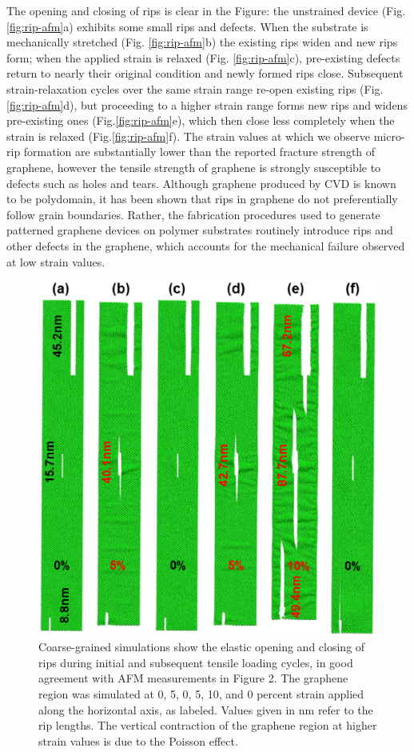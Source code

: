 \documentclass[edeposit,fullpage,draftthesis]{uiucthesis2009}
\begin{document}
        The opening and closing of rips is clear in the Figure:  the unstrained device
        (Fig. \ref{fig:rip-afm}a) exhibits some small rips and defects. When the substrate is
        mechanically stretched (Fig. \ref{fig:rip-afm}b) the existing rips widen and new rips form;
        when the applied strain is relaxed (Fig. \ref{fig:rip-afm}c), pre-existing defects return to
        nearly their original condition and newly formed rips close. Subsequent
        strain-relaxation cycles over the same strain range re-open existing rips (Fig.\ref{fig:rip-afm}d), 
        but proceeding to a higher strain range forms new rips and widens
        pre-existing ones (Fig.\ref{fig:rip-afm}e), which then close less completely when the strain
        is relaxed (Fig.\ref{fig:rip-afm}f). The strain values at which we observe micro-rip formation
        are substantially lower than the reported fracture strength of
        graphene\cite{Lee2008}, however the tensile strength of graphene is strongly
        susceptible to defects such as holes and tears\cite{lee2013high}. Although graphene
        produced by CVD is known to be polydomain, it has been shown that rips in
        graphene do not preferentially follow grain boundaries\cite{Kim2012}. Rather,
        the fabrication procedures used to generate patterned graphene devices on
        polymer substrates routinely introduce rips and other defects in the graphene,
        which accounts for the mechanical failure observed at low strain values.
 
        \begin{figure}
        \centering
        \includegraphics[width=0.5\linewidth]{images/resultsanddiscussion/rippingpaper/Figure4.eps}
        \caption[Simulations of rip formation in uniaxially strained graphene]
            {Coarse-grained simulations show the elastic opening and closing of
            rips during initial and subsequent tensile loading cycles, in good agreement
            with AFM measurements in Figure 2. The graphene region was simulated at 0, 5,
            0, 5, 10, and 0 percent strain applied along the horizontal axis, as labeled.
            Values given in nm refer to the rip lengths. The vertical contraction of the
            graphene region at higher strain values is due to the Poisson effect.}
        \label{fig:rip-simulation}
        \end{figure}
       
\end{document}
